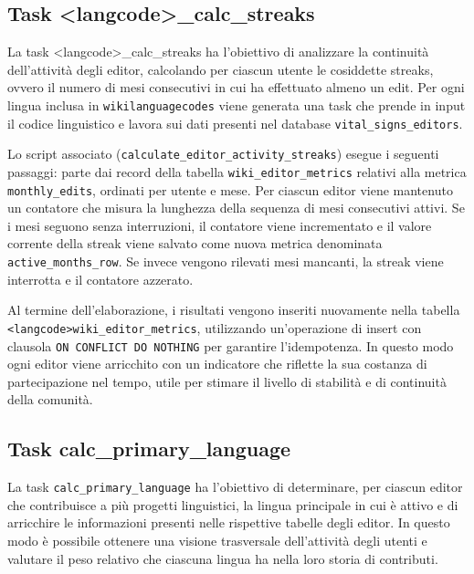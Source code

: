 \subsection{Task \textless langcode\textgreater\_calc\_streaks}
\label{subsec:calc_streaks}

La task \textless langcode\textgreater\_calc\_streaks ha l’obiettivo di analizzare la continuità dell’attività degli editor, calcolando per ciascun utente le cosiddette streaks, ovvero il numero di mesi consecutivi in cui ha effettuato almeno un edit. Per ogni lingua inclusa in \texttt{wikilanguagecodes} viene generata una task che prende in input il codice linguistico e lavora sui dati presenti nel database \texttt{vital\_signs\_editors}.

Lo script associato (\texttt{calculate\_editor\_activity\_streaks}) esegue i seguenti passaggi: parte dai record della tabella \texttt{wiki\_editor\_metrics} relativi alla metrica \texttt{monthly\_edits}, ordinati per utente e mese. Per ciascun editor viene mantenuto un contatore che misura la lunghezza della sequenza di mesi consecutivi attivi. Se i mesi seguono senza interruzioni, il contatore viene incrementato e il valore corrente della streak viene salvato come nuova metrica denominata \texttt{active\_months\_row}. Se invece vengono rilevati mesi mancanti, la streak viene interrotta e il contatore azzerato.

Al termine dell’elaborazione, i risultati vengono inseriti nuovamente nella tabella \texttt{<langcode>wiki\_editor\_metrics}, utilizzando un’operazione di insert con clausola \texttt{ON CONFLICT DO NOTHING} per garantire l’idempotenza. In questo modo ogni editor viene arricchito con un indicatore che riflette la sua costanza di partecipazione nel tempo, utile per stimare il livello di stabilità e di continuità della comunità.

\subsection{Task calc\_primary\_language}
\label{subsec:calc_primary_language}

La task \texttt{calc\_primary\_language} ha l’obiettivo di determinare, per ciascun editor che contribuisce a più progetti linguistici, la lingua principale in cui è attivo e di arricchire le informazioni presenti nelle rispettive tabelle degli editor. In questo modo è possibile ottenere una visione trasversale dell’attività degli utenti e valutare il peso relativo che ciascuna lingua ha nella loro storia di contributi.

